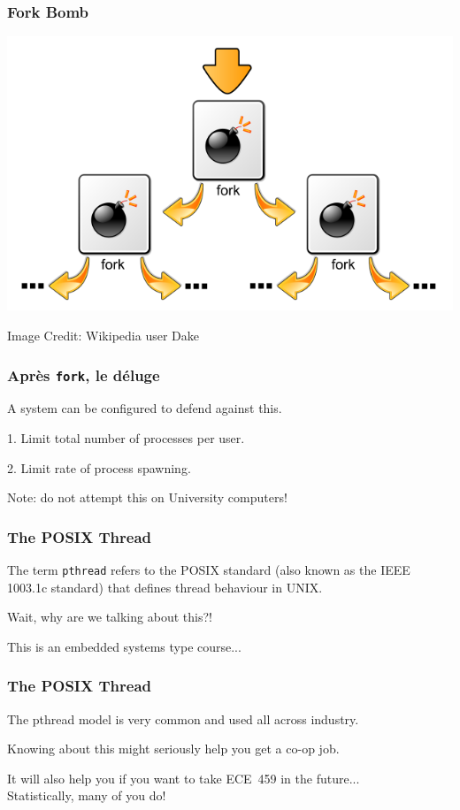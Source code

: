 \begin{frame}
	\frametitle{Fork Bomb}

	\begin{center}
		\includegraphics[width=\textwidth]{images/forkbomb.png}
	\end{center}
	\hfill Image Credit: Wikipedia user Dake

\end{frame}


\begin{frame}
	\frametitle{Apr\`{e}s \texttt{fork}, le d\'{e}luge}
	A system can be configured to defend against this.

	1. Limit total number of processes per user.

	2. Limit rate of process spawning.

	Note: do not attempt this on University computers!

\end{frame}


\begin{frame}
	\frametitle{The POSIX Thread}

	The term \texttt{pthread} refers to the POSIX standard (also known as the IEEE 1003.1c standard) that defines thread behaviour in UNIX.

Wait, why are we talking about this?!

This is an embedded systems type course...

\end{frame}

\begin{frame}
	\frametitle{The POSIX Thread}

The pthread model is very common and used all across industry.

Knowing about this might seriously help you get a co-op job.


It will also help you if you want to take ECE~459 in the future...\\
\quad Statistically, many of you do! 

\end{frame}



